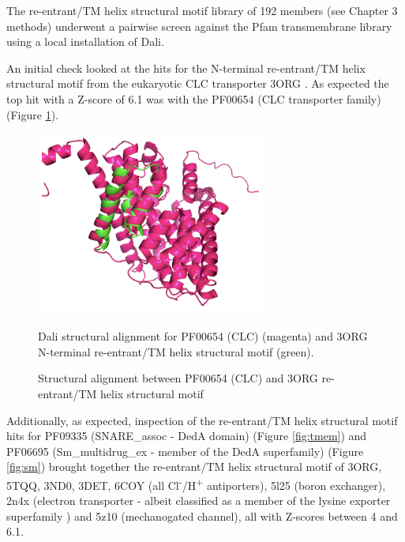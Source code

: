 The re-entrant/TM helix structural motif library of 192 members (see Chapter 3 methods) underwent a pairwise screen against the Pfam transmembrane library using a local installation of Dali.

An initial check looked at the hits for the N-terminal re-entrant/TM helix structural motif from the eukaryotic CLC transporter 3ORG \cite{Feng2010}.  As expected the top hit with a Z-score of 6.1 was with the PF00654 (CLC transporter family) (Figure \ref{fig:clc}).

\begin{figure}[th!]
    \centering
    \includegraphics[width=75mm, scale=0.75]{Pfam/clc.png}
    \caption{Structural alignment between PF00654 (CLC) and 3ORG re-entrant/TM helix structural motif}
    \label{fig:clc}
    \small
   \begin{flushleft}
 Dali structural alignment for PF00654 (CLC) (magenta) and 3ORG N-terminal re-entrant/TM helix structural motif (green).\end{flushleft}

\end{figure}

Additionally, as expected, inspection of the re-entrant/TM helix structural motif hits for PF09335 (SNARE\_assoc - DedA domain) (Figure \ref{fig:tmem}) and PF06695 (Sm\_multidrug\_ex - member of the DedA superfamily) (Figure \ref{fig:sm}) brought together the re-entrant/TM helix structural motif of 3ORG, 5TQQ, 3ND0, 3DET, 6COY (all Cl\textsuperscript{-}/H\textsuperscript{+} antiporters), 5l25 (boron exchanger), 2n4x (electron transporter - albeit classified as a member of the lysine exporter superfamily \cite{Saier2016}) and 5z10 (mechanogated channel), all with Z-scores between 4 and 6.1.  


